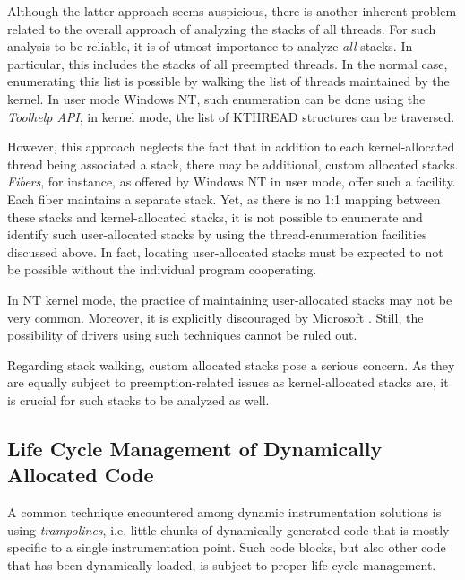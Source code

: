 Although the latter approach seems auspicious, there is another inherent
problem related to the overall approach of analyzing the stacks of all threads.
For such analysis to be reliable, it is of utmost importance to analyze \emph{all}
stacks. In particular, this includes the stacks of all preempted threads. In the normal case,
enumerating this list is possible by walking the list of threads maintained by
the kernel. In user mode Windows NT, such enumeration can be done using the 
\emph{Toolhelp API}, in kernel mode, the list of KTHREAD structures can be
traversed.

However, this approach neglects the fact that in addition to each kernel-allocated
thread being associated a stack, there may be additional, custom allocated stacks.
\emph{Fibers}, for instance, as offered by Windows NT in user mode, offer such a facility. Each fiber 
maintains a separate stack. Yet, as there is no 1:1 mapping between these stacks and
kernel-allocated stacks, it is not possible to enumerate and identify such user-allocated 
stacks by using the thread-enumeration facilities discussed above. In fact, locating 
user-allocated stacks must be expected to not be possible without the individual 
program cooperating. 

In NT kernel mode, the practice of maintaining user-allocated stacks may not be very
common. Moreover, it is explicitly discouraged by Microsoft \cite{Microsoft07}. 
Still, the possibility of drivers using such techniques cannot be ruled out.

Regarding stack walking, custom allocated stacks pose a serious concern.
As they are equally subject to preemption-related issues as kernel-allocated
stacks are, it is crucial for such stacks to be analyzed as well. 


\subsection{Life Cycle Management of Dynamically Allocated Code}
\label{sec:LifecycleManagement}
A common technique encountered among dynamic instrumentation solutions is using
\emph{trampolines}, i.e. little chunks of dynamically generated code
that is mostly specific to a single instrumentation point. Such code blocks, but also
other code that has been dynamically loaded, is subject to proper life cycle management.

